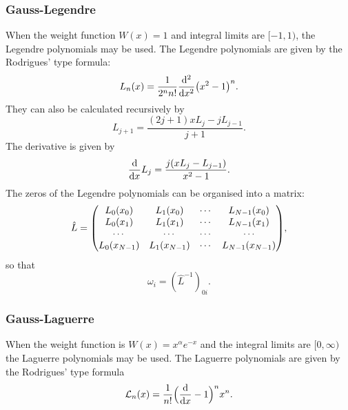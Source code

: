 \documentclass[notitlepage, reprint, nofootinbib]{revtex4-1}
\begin{document}
\subsubsection{Gauss-Legendre}
When the weight function $W(x)=1$ and integral limits are $[-1,1)$, the Legendre polynomials may be used. The Legendre polynomials are given by the Rodrigues' type formula: 
\begin{equation}\label{rodrigues1}L_n(x)=\frac{1}{2^n n!}\dv[2]{x} (x^2-1)^n.\end{equation}
They can also be calculated recursively by 
\begin{equation}\label{legendre} L_{j+1} = \frac{(2j+1)xL_j-jL_{j-1}}{j+1}.\end{equation}
The derivative is given by
\begin{equation}\label{ddlegendre} \dv{x} L_j = \frac{j (xL_j-L_{j-1})}{x^2-1}.\end{equation}
The zeros of the Legendre polynomials can be organised into a matrix: 
\begin{equation}\label{L_hat}\hat{L}=\mqty(L_0(x_0)&L_1(x_0)&\cdots&L_{N-1}(x_0)\\L_0(x_1)&L_1(x_1)&\cdots&L_{N-1}(x_1)\\ \cdots &\cdots&\cdots&\cdots\\L_0(x_{N-1})&L_1(x_{N-1})&\cdots&L_{N-1}(x_{N-1})),\end{equation}
so that 
\begin{equation}\label{omega_leg}\omega_i =(\hat{L}^{-1})_{0i}.\end{equation}

\subsubsection{Gauss-Laguerre}
When the weight function is $W(x)=x^\alpha e^{-x}$ and the integral limits are $[0,\infty)$ the Laguerre polynomials may be used. The Laguerre polynomials are given by the Rodrigues' type formula
\begin{equation}\label{rodrigues2}\mathcal{L}_n(x)=\frac{1}{n!}\Big(\dv{x}-1\Big)^nx^n.\end{equation}
\end{document}
